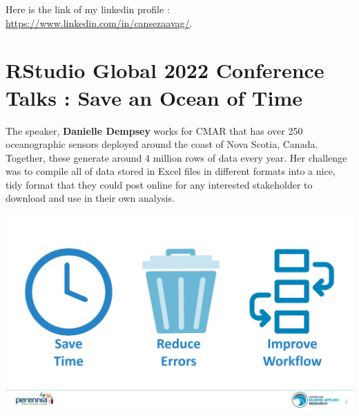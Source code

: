 \documentclass[
  letterpaper,
  DIV=11,
  numbers=noendperiod]{scrreprt}
\begin{document}
Here is the link of my linkedin profile :
\url{https://www.linkedin.com/in/cansezaavag/}.

\hypertarget{rstudio-global-2022-conference-talks-save-an-ocean-of-time}{%
\section{RStudio Global 2022 Conference Talks : Save an Ocean of
Time}\label{rstudio-global-2022-conference-talks-save-an-ocean-of-time}}

The speaker, \textbf{Danielle Dempsey} works for CMAR that has over 250
oceanographic sensors deployed around the coast of Nova Scotia, Canada.
Together, these generate around 4 million rows of data every year. Her
challenge was to compile all of data stored in Excel files in different
formats into a nice, tidy format that they could post online for any
interested stakeholder to download and use in their own analysis.

\includegraphics{./writingcode.png}
\end{document}
